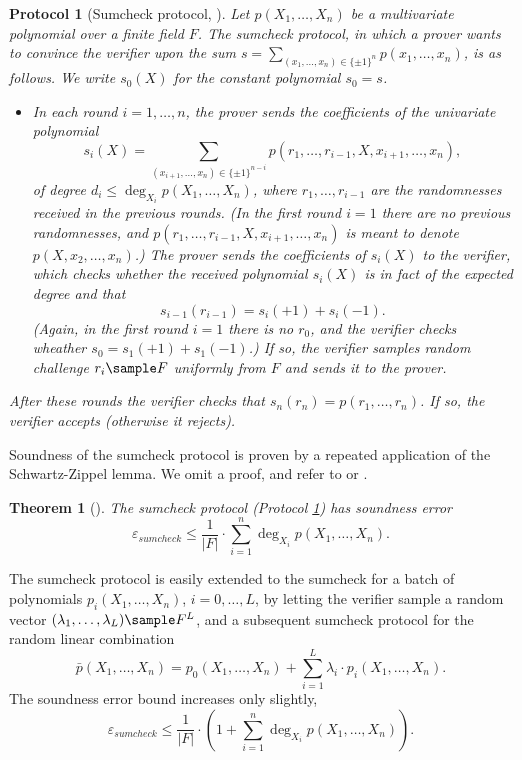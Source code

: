 \documentclass[11pt]{article}
\newtheorem{thm}{Theorem}[]
\newtheorem{protocol}[]{Protocol}
\theoremstyle{definition}
\theoremstyle{remark}
\begin{document}
\begin{protocol}[Sumcheck protocol, \cite{sumcheck}]
\label{p:Sumcheck}
Let $p(X_1,\ldots, X_n)$ be a multivariate polynomial over a finite field $F$. %
The sumcheck protocol, in which a prover wants to convince the verifier upon the sum $s = \sum_{(x_1,\ldots, x_n) \in \{\pm 1\}^n} p(x_1, \ldots, x_n)$, is as follows.
We write $s_0(X)$ for the constant polynomial $s_0 =s$.
\begin{itemize}
\item
In each round $i=1,\ldots, n$, the prover sends the coefficients of the univariate polynomial 
\[
s_i(X) = \sum_{(x_{i+1},\ldots, x_n) \in \{\pm 1\}^{n-i}} p(r_1,\ldots, r_{i-1},X ,x_{i+1}, \ldots, x_n),
\]
of degree $d_i \leq \deg_{X_i} p(X_1,\ldots, X_n)$, where $r_1, \ldots, r_{i-1}$ are the randomnesses received in the previous rounds. (In the first round $i=1$ there are no previous randomnesses, and $p(r_1,\ldots, r_{i-1},X ,x_{i+1}, \ldots, x_n)$ is meant to denote $p(X,x_2,\ldots, x_n)$.)
The prover sends the coefficients of $s_{i}(X)$ to the verifier, which checks whether the received polynomial $s_i(X)$ is in fact of the expected degree and that
\[
s_{i-1}(r_{i-1}) = s_{i}(+1) + s_{i}(-1).
\] 
(Again, in the first round $i=1$ there is no $r_0$, and the verifier checks wheather $s_0 = s_1(+1) + s_1(-1)$.) 
If so, the verifier samples random challenge $r_i\sample F$ uniformly from $F$ and sends it to the prover.
\end{itemize}
After these rounds the verifier checks that $s_n(r_n) = p(r_1,\ldots, r_n)$. 
If so, the verifier accepts (otherwise it rejects).  
\end{protocol}


Soundness of the sumcheck protocol is proven by a repeated application of the Schwartz-Zippel lemma. 
We omit a proof, and refer to \cite{sumcheck} or \cite{SumcheckThaler}. 
\begin{thm}[\cite{sumcheck}]
The sumcheck protocol (Protocol \ref{p:Sumcheck}) has soundness error
\begin{equation}
\label{e:SumcheckSoundness}
\varepsilon_{sumcheck} \leq \frac{1}{|F|}\cdot \sum_{i=1}^n \deg_{X_i} p(X_1,\ldots, X_n).
\end{equation}
\end{thm}

The sumcheck protocol is easily extended to the sumcheck for a batch of polynomials $p_i(X_1,\ldots, X_n)$, $i=0, \ldots, L$, by letting the verifier sample a random vector $(\lambda_1,\ldots, \lambda_L)\sample F^L$, and a subsequent sumcheck protocol for the random linear combination
\[
\bar p (X_1, \ldots, X_n) = p_0(X_1,\ldots, X_n) + \sum_{i=1}^{L} \lambda_i \cdot p_i(X_1,\ldots, X_n).
\]
The soundness error bound increases only slightly,
\begin{equation}
\label{e:BatchSumcheckSoundness}
\varepsilon_{sumcheck} \leq \frac{1}{|F|}\cdot \left(1 + \sum_{i=1}^n \deg_{X_i} p(X_1,\ldots, X_n)\right).
\end{equation}
\end{document}
